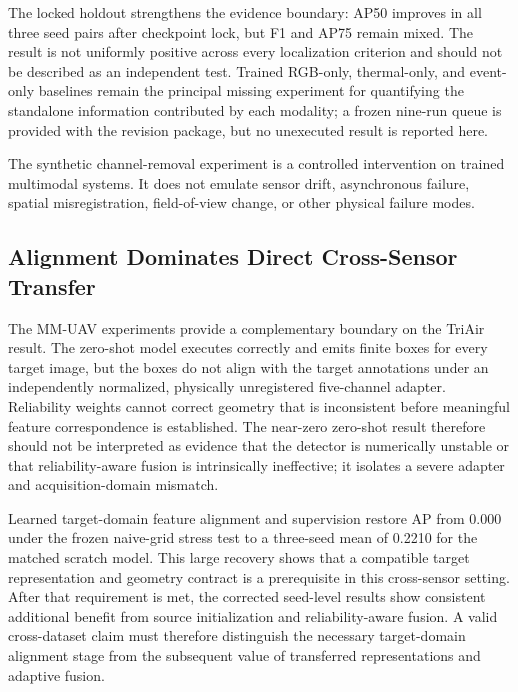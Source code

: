 The locked holdout strengthens the evidence boundary: AP50 improves in all three seed pairs after checkpoint lock, but F1 and AP75 remain mixed. The result is not uniformly positive across every localization criterion and should not be described as an independent test. Trained RGB-only, thermal-only, and event-only baselines remain the principal missing experiment for quantifying the standalone information contributed by each modality; a frozen nine-run queue is provided with the revision package, but no unexecuted result is reported here.

The synthetic channel-removal experiment is a controlled intervention on trained multimodal systems. It does not emulate sensor drift, asynchronous failure, spatial misregistration, field-of-view change, or other physical failure modes.

\subsection{Alignment Dominates Direct Cross-Sensor Transfer}
The MM-UAV experiments provide a complementary boundary on the TriAir result. The zero-shot model executes correctly and emits finite boxes for every target image, but the boxes do not align with the target annotations under an independently normalized, physically unregistered five-channel adapter. Reliability weights cannot correct geometry that is inconsistent before meaningful feature correspondence is established. The near-zero zero-shot result therefore should not be interpreted as evidence that the detector is numerically unstable or that reliability-aware fusion is intrinsically ineffective; it isolates a severe adapter and acquisition-domain mismatch.

Learned target-domain feature alignment and supervision restore AP from 0.000 under the frozen naive-grid stress test to a three-seed mean of 0.2210 for the matched scratch model. This large recovery shows that a compatible target representation and geometry contract is a prerequisite in this cross-sensor setting. After that requirement is met, the corrected seed-level results show consistent additional benefit from source initialization and reliability-aware fusion. A valid cross-dataset claim must therefore distinguish the necessary target-domain alignment stage from the subsequent value of transferred representations and adaptive fusion.


